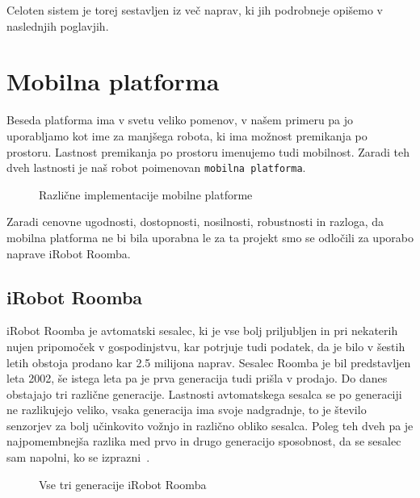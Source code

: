 \documentclass[a4paper, 12pt]{book}
\begin{document}
Celoten sistem je torej sestavljen iz več naprav, ki jih podrobneje opišemo v naslednjih poglavjih.

\chapter{Mobilna platforma}
Beseda platforma ima v svetu veliko pomenov, v našem primeru pa jo uporabljamo kot ime za manjšega robota, ki ima možnost premikanja po prostoru. Lastnost premikanja po prostoru imenujemo tudi mobilnost. Zaradi teh dveh lastnosti je naš robot poimenovan {\tt mobilna platforma}.

\begin{figure}[h]
	\centering
	 \hfill
	 \hfill
	 \hfill
	\caption{Različne implementacije mobilne platforme}
	\label{picRobot}
\end{figure}

Zaradi cenovne ugodnosti, dostopnosti, nosilnosti, robustnosti in razloga, da mobilna platforma ne bi bila uporabna le za ta projekt smo se odločili za uporabo naprave iRobot Roomba. 

\section{iRobot Roomba}
iRobot Roomba je avtomatski sesalec, ki je vse bolj priljubljen in pri nekaterih nujen pripomoček v gospodinjstvu, kar potrjuje tudi podatek, da je bilo v šestih letih obstoja prodano kar 2.5 milijona naprav. Sesalec Roomba je bil predstavljen leta 2002, še istega leta pa je prva generacija tudi prišla v prodajo. Do danes obstajajo tri različne generacije. Lastnosti avtomatskega sesalca se po generaciji ne razlikujejo veliko, vsaka generacija ima svoje nadgradnje, to je število senzorjev za bolj učinkovito vožnjo in različno obliko sesalca. Poleg teh dveh pa je najpomembnejša razlika med prvo in drugo generacijo sposobnost, da se sesalec sam napolni, ko se izprazni~\cite{bibWikiRoomba}. 

\begin{figure}[h]
	\centering
	 \hfill
	 \hfill
	 \hfill
	\caption{Vse tri generacije iRobot Roomba}
	\label{picRobot}
\end{figure}
\end{document}
